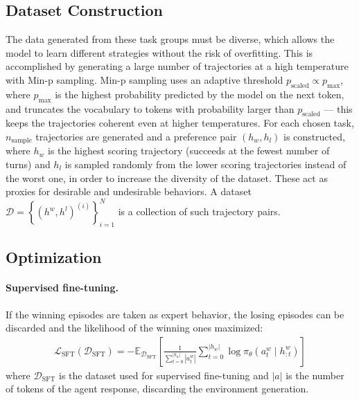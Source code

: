 \documentclass[manuscript,review]{acmart}
\begin{document}
{\subsection{Dataset Construction}
{
The data generated from these task groups must be diverse, which allows the model to
learn different strategies without the risk of overfitting. This is accomplished by
generating a large number of trajectories at a high temperature with Min-p
sampling\cite{nguyen2024turning}. Min-p sampling uses an adaptive threshold
$p_\text{scaled} \propto p_\text{max}$, where $p_\text{max}$ is the highest probability
predicted by the model on the next token, and truncates the vocabulary to tokens with
probability larger than $p_\text{scaled}$ --- this keeps the trajectories coherent even
at higher temperatures. For each chosen task, $n_\text{sample}$ trajectories are generated
and a preference pair $(h_{w}, h_{l})$ is constructed, where $h_{w}$ is the highest
scoring trajectory (succeeds at the fewest number of turns) and $h_{l}$ is sampled
randomly from the lower scoring trajectories instead of the worst one, in order to
increase the diversity of the dataset. These act as proxies for desirable and undesirable
behaviors. A dataset $\mathcal{D} = \left\{\left(h^{w}, h^{l}\right)^{(i)}\right\}_{i=1}^N$
is a collection of such trajectory pairs.
}

\subsection{Optimization}
{
\paragraph{Supervised fine-tuning.}{
If the winning episodes are taken as expert behavior, the losing episodes can be discarded
and the likelihood of the winning ones maximized:
\begin{align}
    \label{eq:sft}
    \mathcal{L}_\text{SFT}(\mathcal{D}_\text{SFT}) = -\mathbb{E}_{\mathcal{D}_\text{SFT}} \left[ \frac{1}{\sum_{t=0}^{|h_w|}|a_t^w|}\sum_{t=0}^{|h_w|} \log \pi_\theta \left(a^w_t \mid h^w_{:t}\right) \right]
\end{align}
where $\mathcal{D}_\text{SFT}$ is the dataset used for supervised fine-tuning and $|a|$
is the number of tokens of the agent response, discarding the environment generation.
}

}}
\end{document}
